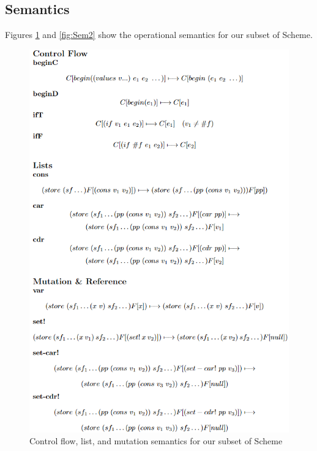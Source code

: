 \subsection{Semantics}
Figures \ref{fig:Sem1} and \ref{fig:Sem2} show the operational semantics for our subset of Scheme.
\begin{figure}
\centering
\includegraphics[width=\textwidth,height=\textheight,keepaspectratio]{figures/sem_1.png}
    \caption{Control flow, list, and mutation semantics for our subset of Scheme}
    \label{fig:Sem1}
\end{figure}

